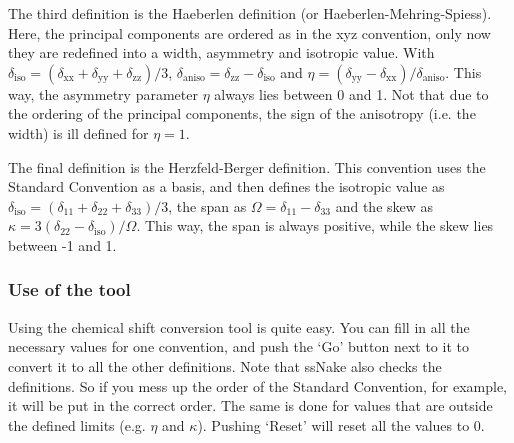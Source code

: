 \documentclass[11pt,a4paper]{article}
\begin{document}
The third definition is the Haeberlen definition (or Haeberlen-Mehring-Spiess). Here, the principal components are ordered as in the xyz convention, only now they are redefined into a width, asymmetry and isotropic value. With $\delta_\text{iso} = (\delta_\text{xx} +\delta_\text{yy} +\delta_\text{zz})/3$, $\delta_\text{aniso} = \delta_\text{zz} -\delta_\text{iso}$ and $\eta = (\delta_\text{yy}-\delta_\text{xx})/\delta_\text{aniso}$. This way, the asymmetry parameter $\eta$ always lies between 0 and 1. Not that due to the ordering of the principal components, the sign of the anisotropy (i.e. the width) is ill defined for $\eta=1$.

The final definition is the Herzfeld-Berger definition. This convention uses the Standard Convention as a basis, and then defines the isotropic value as $\delta_\text{iso} = (\delta_\text{11} + \delta_\text{22} + \delta_\text{33})/3$, the span as $\Omega = \delta_\text{11} - \delta_\text{33}$ and the skew as $\kappa = 3(\delta_\text{22}-\delta_\text{iso})/\Omega$. This way, the span is always positive, while the skew lies between -1 and 1.



\subsubsection*{Use of the tool}
Using the chemical shift conversion tool is quite easy. You can fill in all the necessary values for one convention, and push the `Go' button next to it to convert it to all the other definitions. Note that ssNake also checks the definitions. So if you mess up the order of the Standard Convention, for example, it will be put in the correct order. The same is done for values that are outside the defined limits (e.g. $\eta$ and $\kappa$). Pushing `Reset' will reset all the values to 0.
\end{document}
